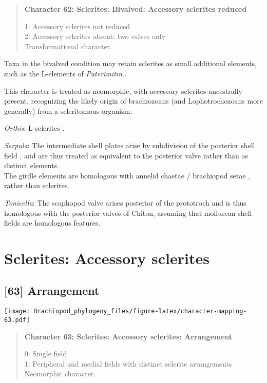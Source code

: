 \documentclass[openany]{book}
\theoremstyle{definition}
\theoremstyle{definition}
\theoremstyle{definition}
\theoremstyle{remark}
\begin{document}
\begin{quote}
\textbf{Character 62: Sclerites: Bivalved: Accessory sclerites reduced}

1: Accessory sclerites not reduced\\
2: Accessory sclerites absent: two valves only\\
Transformational character.
\end{quote}

Taxa in the bivalved condition may retain sclerites as small additional
elements, such as the L-elements of \emph{Paterimitra}
\citep{Skovsted2015Theearly}.

This character is treated as neomorphic, with accessory sclerites
ancestrally present, recognizing the likely origin of brachiozoans (and
Lophotrochozoans more generally) from a scleritomous organism.

\hypertarget{Orthis-coding-62}{}
\emph{Orthis}: L-sclerites \citep{Skovsted2009Thescleritome}.

\hypertarget{Serpula-coding-62}{}
\emph{Serpula}: The intermediate shell plates arise by subdivision of
the posterior shell field \citep{Wanninger2002C}, and are thus treated
as equivalent to the posterior valve rather than as distinct elements.\\
The girdle elements are homologous with annelid chaetae / brachiopod
setae \citep{Leise1982}, rather than sclerites.

\hypertarget{Tonicella-coding-62}{}
\emph{Tonicella}: The scaphopod valve arises posterior of the prototroch
and is thus homologous with the posterior valves of Chiton, assuming
that molluscan shell fields are homologous features.

\section{Sclerites: Accessory
sclerites}\label{sclerites-accessory-sclerites}

\subsection*{{[}63{]} Arrangement}\label{arrangement}

\texttt{[image: Brachiopod\_phylogeny\_files/figure-latex/character-mapping-63.pdf]}

\begin{quote}
\textbf{Character 63: Sclerites: Accessory sclerites: Arrangement}

0: Single field\\
1: Peripheral and medial fields with distinct sclerite arrangements\\
Neomorphic character.
\end{quote}
\end{document}
